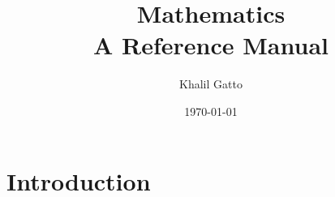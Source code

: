 \documentclass{article}
\title{Mathematics\\A Reference Manual}
\author{Khalil Gatto}
\date{\today}
\begin{document}
\maketitle

\section{Introduction}
\end{document}
